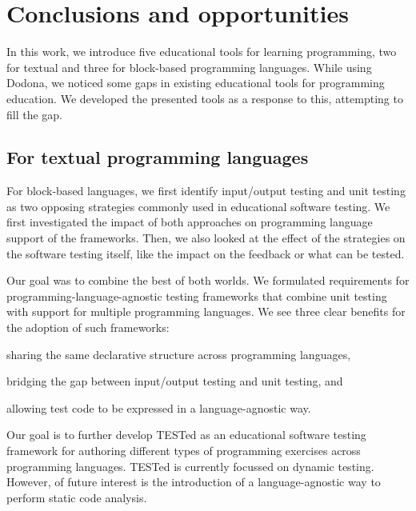 \documentclass[main]{subfiles}
\begin{document}
\chapter{Conclusions and opportunities}\label{ch:conclusions-and-opportunities}

In this work, we introduce five educational tools for learning programming, two for textual and three for block-based programming languages.
While using Dodona, we noticed some gaps in existing educational tools for programming education.
We developed the presented tools as a response to this, attempting to fill the gap.


\section{For textual programming languages}\label{sec:for-textual-programming-languages}

For block-based languages, we first identify input/output testing and unit testing as two opposing strategies commonly used in educational software testing.
We first investigated the impact of both approaches on programming language support of the frameworks.
Then, we also looked at the effect of the strategies on the software testing itself, like the impact on the feedback or what can be tested.

Our goal was to combine the best of both worlds.
We formulated requirements for programming-language-agnostic testing frameworks that combine unit testing with support for multiple programming languages.
We see three clear benefits for the adoption of such frameworks: \begin{enumerate*}[label=\emph{\roman*})] \item sharing the same declarative structure across programming languages, \item bridging the gap between input/output testing and unit testing, and \item allowing test code to be expressed in a language-agnostic way.\end{enumerate*}

Our goal is to further develop TESTed as an educational software testing framework for authoring different types of programming exercises across programming languages.
TESTed is currently focussed on dynamic testing.
However, of future interest is the introduction of a language-agnostic way to perform static code analysis.
\end{document}
